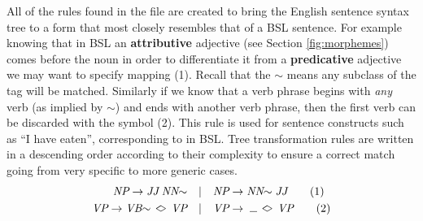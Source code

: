 \documentclass[12pt]{ociamthesis}  %
\newcommand{\anything}{\mathbin{\rotatebox[origin=c]{90}{$\lozenge$}}}
\newcommand{\nothing}{\text{\rule{1.5ex}{0.4pt}\;}}
\begin{document}
All of the rules found in the file are created to bring the English sentence syntax tree to a form that most closely resembles that of a BSL sentence. For example knowing that in BSL an \textbf{attributive} adjective (see Section \ref{fig:morphemes}) comes before the noun in order to differentiate it from a \textbf{predicative} adjective we may want to specify mapping (1). Recall that the $\sim$ means any subclass of the tag will be matched. Similarly if we know that a verb phrase begins with \textit{any} verb (as implied by $\sim$) and ends with another verb phrase, then the first verb can be discarded with the \nothing symbol (2). This rule is used for sentence constructs such as ``I have eaten'', corresponding to  in BSL. Tree transformation rules are written in a descending order according to their complexity to ensure a correct match going from very specific to more generic cases.
\begin{align*}
  \textit{NP} \rightarrow \textit{JJ} \; \textit{NN$\sim$} &\quad|\quad \textit{NP} \rightarrow \textit{NN$\sim$} \; \textit{JJ} \tag{1} \\
  \textit{VP} \rightarrow \textit{VB$\sim$} \; \anything \; \textit{VP} &\quad|\quad \textit{VP} \rightarrow \; \nothing \anything \; \textit{VP} \tag{2}
\end{align*}
\end{document}
